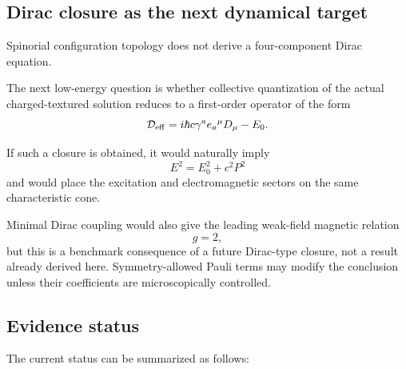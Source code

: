 \documentclass[11pt]{article}
\begin{document}
\subsection{Dirac closure as the next dynamical target}

Spinorial configuration topology does not derive a four-component Dirac equation.

The next low-energy question is whether collective quantization of the actual charged-textured solution reduces to a first-order operator of the form
\begin{equation}
\mathcal D_{\rm eff}
=
i\hbar c\gamma^a e_a{}^\mu D_\mu
-
E_0.
\end{equation}

If such a closure is obtained, it would naturally imply
\begin{equation}
E^2
=
E_0^2+c^2P^2
\end{equation}
and would place the excitation and electromagnetic sectors on the same characteristic cone.

Minimal Dirac coupling would also give the leading weak-field magnetic relation
\begin{equation}
g=2,
\end{equation}
but this is a benchmark consequence of a future Dirac-type closure, not a result already derived here. Symmetry-allowed Pauli terms may modify the conclusion unless their coefficients are microscopically controlled.

\subsection{Evidence status}

The current status can be summarized as follows:
\end{document}
